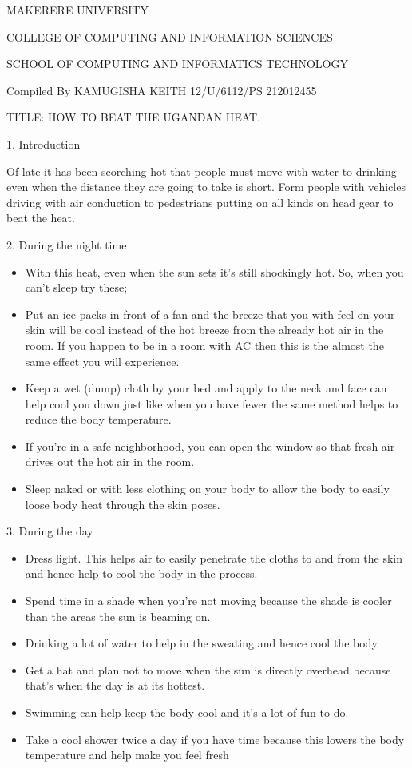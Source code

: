 \documentclass{article}
\begin{document}
MAKERERE  UNIVERSITY

COLLEGE OF COMPUTING AND INFORMATION SCIENCES

SCHOOL OF COMPUTING AND INFORMATICS TECHNOLOGY

Compiled By
KAMUGISHA KEITH
12/U/6112/PS
212012455

TITLE: HOW TO BEAT THE UGANDAN HEAT.



1.	Introduction

Of late it has been scorching hot that people must move with water to drinking even when the distance they are going to take is short. Form people with vehicles driving with air conduction to pedestrians putting on all kinds on head gear to beat the heat.

2.	During the night time

\begin{itemize}
\item With this heat, even when the sun sets it’s still shockingly hot. So, when you can’t sleep try these;
\item Put an ice packs in front of a fan and the breeze that you with feel on your skin will be cool instead of the hot breeze from the already hot air in the room. If you happen to be in a room with AC then this is the almost the same effect you will experience. 
\item Keep a wet (dump) cloth by your bed and apply to the neck and face can help cool you down just like when you have fewer the same method helps to reduce the body temperature.
\item If you’re in a safe neighborhood, you can open the window so that fresh air drives out the hot air in the room.
\item Sleep naked or with less clothing on your body to allow the body to easily loose body heat through the skin poses. 
\end{itemize}

3.	During the day

\begin{itemize}
\item Dress light. This helps air to easily penetrate the cloths to and from the skin and hence help to cool the body in the process.
\item Spend time in a shade when you’re not moving because the shade is cooler than the areas the sun is beaming on.
\item Drinking a lot of water to help in the sweating and hence cool the body.
\item Get a hat and plan not to move when the sun is directly overhead because that’s when the day is at its hottest.
\item Swimming can help keep the body cool and it’s a lot of fun to do.
\item Take a cool shower twice a day if you have time because this lowers the body temperature and help make you feel fresh
\end{itemize}
\end{document}
